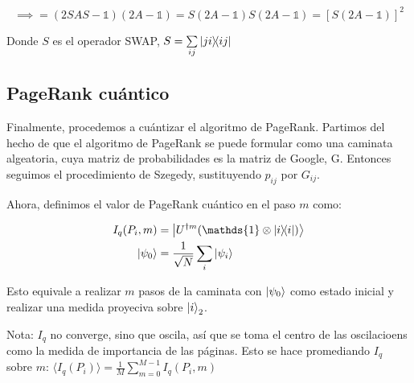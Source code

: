 \documentclass[11pt, spanish]{report}
\begin{document}
\[
\implies = (2 S A S - \mathds{1})(2 A - \mathds{1}) = S (2 A - \mathds{1}) S (2
A - \mathds{1}) = [S (2 A - \mathds{1})]^2
\]

Donde $S$ es el operador SWAP, $S = \sum\limits_{i j} \ketbra{j i}{i j}$

\subsection{PageRank cuántico}

Finalmente, procedemos a cuántizar el algoritmo de PageRank. Partimos del hecho
de que el algoritmo de PageRank se puede formular como una caminata algeatoria,
cuya matriz de probabilidades es la matriz de Google, G. Entonces seguimos el
procedimiento de Szegedy, sustituyendo $p_{i j}$ por $G_{i j}$.

Ahora, definimos el valor de PageRank cuántico en el paso $m$ como:

\begin{align*}
I_q(P_i,m) &= \ket{U^{\dagger m}(\mathds{1} \otimes \ketbra{i}{i})} \\
\ket{\psi_0} &= \frac{1}{\sqrt{N}} \sum\limits_i \ket{\psi_i}
\end{align*}

Esto equivale a realizar $m$ pasos de la caminata con $\ket{\psi_0}$ como estado
inicial y realizar una medida proyeciva sobre $\ket{i}_2$.

Nota: $I_q$ no converge, sino que oscila, así que se toma el centro de las
oscilacioens como la medida de importancia de las páginas. Esto se hace
promediando $I_q$ sobre $m$: $\langle I_q(P_i) \rangle = \frac{1}{M}
\sum\limits_{m=0}^{M-1} I_q(P_i,m)$ 





\end{document}
